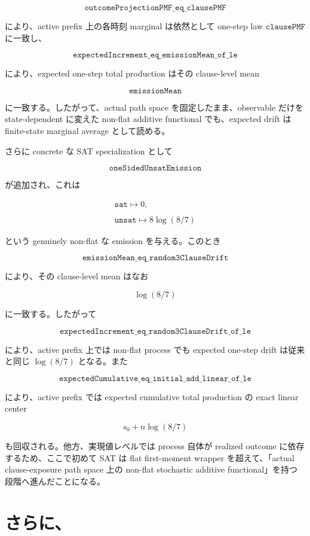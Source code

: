 \documentclass[12pt,a4paper]{article}
\begin{document}
\[
\texttt{outcomeProjectionPMF\_eq\_clausePMF}
\]

により、active prefix 上の各時刻 marginal は依然として one-step law \(\texttt{clausePMF}\) に一致し、

\[
\texttt{expectedIncrement\_eq\_emissionMean\_of\_le}
\]

により、expected one-step total production はその clause-level mean

\[
\texttt{emissionMean}
\]

に一致する。したがって、actual path space を固定したまま、observable だけを state-dependent に変えた non-flat additive functional でも、expected drift は finite-state marginal average として読める。

さらに concrete な SAT specialization として

\[
\texttt{oneSidedUnsatEmission}
\]

が追加され、これは

\[
\begin{aligned}
\texttt{sat} \mapsto 0, \\
\qquad \\
\texttt{unsat} \mapsto 8\log(8/7)
\end{aligned}
\]

という genuinely non-flat な emission を与える。このとき

\[
\texttt{emissionMean\_eq\_random3ClauseDrift}
\]

により、その clause-level mean はなお

\[
\log(8/7)
\]

に一致する。したがって

\[
\texttt{expectedIncrement\_eq\_random3ClauseDrift\_of\_le}
\]

により、active prefix 上では non-flat process でも expected one-step drift は従来と同じ \(\log(8/7)\) となる。また

\[
\texttt{expectedCumulative\_eq\_initial\_add\_linear\_of\_le}
\]

により、active prefix では expected cumulative total production の exact linear center

\[
s_0 + n \log(8/7)
\]

も回収される。他方、実現値レベルでは process 自体が realized outcome に依存するため、ここで初めて SAT は flat first-moment wrapper を超えて、「actual clause-exposure path space 上の non-flat stochastic additive functional」を持つ段階へ進んだことになる。

\section{さらに、}\label{ux3055ux3089ux306b-17}
\end{document}
